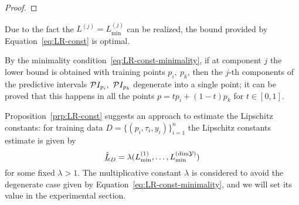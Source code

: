 \begin{proof}
\end{proof}
\begin{rmk}
Due to the fact the $L^{(j)}=L^{(j)}_{\min}$ can be realized, the bound provided by Equation~\eqref{eq:LR-const} is optimal. 
\end{rmk}
\begin{rmk}
By the minimality condition~\eqref{eq:LR-const-minimality}, if at component $j$ the lower bound is obtained with training points $p_i, \ p_k$, then the $j$-th components of the predictive intervals $\mathcal PI_{p_i},\ \mathcal PI_{p_k}$ degenerate into a single point; it can be proved that this happens in all the points $p = t p_i + (1-t) p_k$ for $t \in [0,1]$. 
\end{rmk}

Proposition~\ref{prp:LR-const} suggests an approach to estimate the Lipschitz constants: for training data $D=\{ (p_i, \tau_i, y_i) \}_{i=1}^n$ the Lipschitz constants estimate is given by 
\begin{equation}\label{eq:lips-const}
    \hat{\underline{L}}_D = \lambda ( L^{(1)}_{\min}, \dots, L^{(\text{dim}\mathcal Y)}_{\min})
\end{equation} for some fixed $\lambda > 1$. 
The multiplicative constant $\lambda$ is considered to avoid the degenerate case given by Equation~\eqref{eq:LR-const-minimality}, and we will set its value in the experimental section.